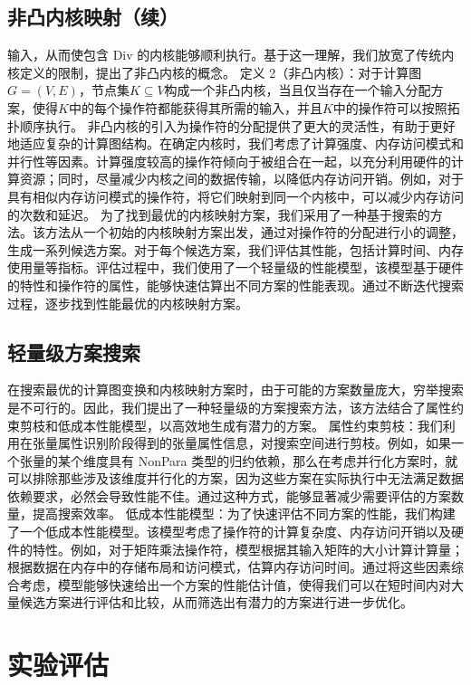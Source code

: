 \subsection{非凸内核映射（续）}
输入，从而使包含 Div 的内核能够顺利执行。基于这一理解，我们放宽了传统内核定义的限制，提出了非凸内核的概念。
定义 2（非凸内核）：对于计算图\(G=(V, E)\)，节点集\(K \subseteq V\)构成一个非凸内核，当且仅当存在一个输入分配方案，使得\(K\)中的每个操作符都能获得其所需的输入，并且\(K\)中的操作符可以按照拓扑顺序执行。
非凸内核的引入为操作符的分配提供了更大的灵活性，有助于更好地适应复杂的计算图结构。在确定内核时，我们考虑了计算强度、内存访问模式和并行性等因素。计算强度较高的操作符倾向于被组合在一起，以充分利用硬件的计算资源；同时，尽量减少内核之间的数据传输，以降低内存访问开销。例如，对于具有相似内存访问模式的操作符，将它们映射到同一个内核中，可以减少内存访问的次数和延迟。
为了找到最优的内核映射方案，我们采用了一种基于搜索的方法。该方法从一个初始的内核映射方案出发，通过对操作符的分配进行小的调整，生成一系列候选方案。对于每个候选方案，我们评估其性能，包括计算时间、内存使用量等指标。评估过程中，我们使用了一个轻量级的性能模型，该模型基于硬件的特性和操作符的属性，能够快速估算出不同方案的性能表现。通过不断迭代搜索过程，逐步找到性能最优的内核映射方案。
\subsection{轻量级方案搜索}
在搜索最优的计算图变换和内核映射方案时，由于可能的方案数量庞大，穷举搜索是不可行的。因此，我们提出了一种轻量级的方案搜索方法，该方法结合了属性约束剪枝和低成本性能模型，以高效地生成有潜力的方案。
属性约束剪枝：我们利用在张量属性识别阶段得到的张量属性信息，对搜索空间进行剪枝。例如，如果一个张量的某个维度具有 NonPara 类型的归约依赖，那么在考虑并行化方案时，就可以排除那些涉及该维度并行化的方案，因为这些方案在实际执行中无法满足数据依赖要求，必然会导致性能不佳。通过这种方式，能够显著减少需要评估的方案数量，提高搜索效率。
低成本性能模型：为了快速评估不同方案的性能，我们构建了一个低成本性能模型。该模型考虑了操作符的计算复杂度、内存访问开销以及硬件的特性。例如，对于矩阵乘法操作符，模型根据其输入矩阵的大小计算计算量；根据数据在内存中的存储布局和访问模式，估算内存访问时间。通过将这些因素综合考虑，模型能够快速给出一个方案的性能估计值，使得我们可以在短时间内对大量候选方案进行评估和比较，从而筛选出有潜力的方案进行进一步优化。


\section{实验评估}
